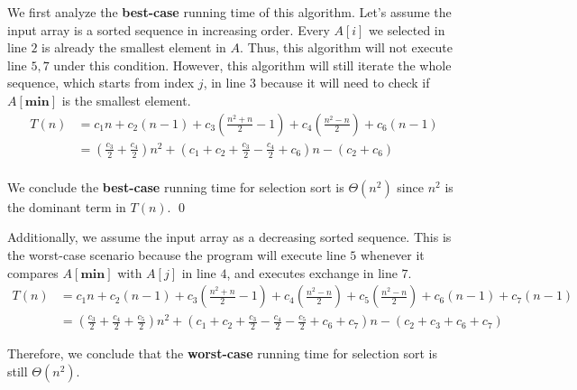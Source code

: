 \documentclass[a4paper]{article}
\makeatletter
\newenvironment{solution}
  {\begin{proof}[Solution]}
  {\end{proof}}
\renewenvironment{proof}[1][\proofname]{%
  \par\pushQED{\qed}\normalfont%
  \topsep6\p@\@plus6\p@\relax
  \trivlist\item[\hskip\labelsep\bfseries#1\@addpunct{.}]%
  \ignorespaces
}{%
  \popQED\endtrivlist\@endpefalse
}
\makeatother
\begin{document}
\begin{solution}
  We first analyze the \textbf{best-case} running time of this algorithm. Let's assume the input array is a sorted sequence in increasing order. Every $A[i]$ we selected in line $2$ is already the smallest element in $A$. Thus, this algorithm will not execute line $5, 7$ under this condition. However, this algorithm will still iterate the whole sequence, which starts from index $j$, in line $3$ because it will need to check if $A[\textbf{min}]$ is the smallest element.
  \begin{align*}
    T(n)  &= c_1 n + c_2(n - 1) + c_3(\frac{n^2 + n}{2} - 1) + c_4(\frac{n^2 - n}{2}) + c_6(n -1)\\
         &= (\frac{c_3}{2} + \frac{c_4}{2}) n^2 + (c_1 + c_2 + \frac{c_3}{2} - \frac{c_4}{2} + c_6)n - (c_2 + c_6) \\
  \end{align*}

  We conclude the \textbf{best-case} running time for selection sort is $\Theta(n^2)$ since $n^2$ is the dominant term in $T(n)$. \qed

  Additionally, we assume the input array as a decreasing sorted sequence. This is the worst-case scenario because the program will execute line $5$ whenever it compares $A[\textbf{min}]$ with $A[j]$ in line $4$, and executes exchange in line $7$.
  \begin{align*}
    T(n) &=c_1 n + c_2(n - 1) + c_3(\frac{n^2 + n}{2} - 1) + c_4(\frac{n^2 - n}{2})+c_5(\frac{n^2 - n}{2}) + c_6(n - 1) + c_7(n - 1)\\
         &= (\frac{c_3}{2} + \frac{c_4}{2} + \frac{c_5}{2})n^2 + (c_1 + c_2 + \frac{c_3}{2} - \frac{c_4}{2} - \frac{c_5}{2} + c_6 + c_7)n - (c_2 + c_3 + c_6 + c_7)
  \end{align*}

  Therefore, we conclude that the \textbf{worst-case} running time for selection sort is still $\Theta(n^2)$.
\end{solution}
\end{document}

